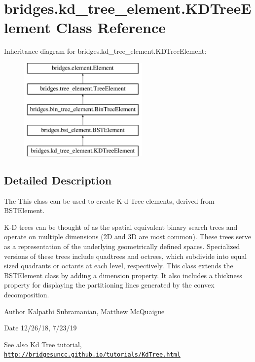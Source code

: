 \hypertarget{classbridges_1_1kd__tree__element_1_1_k_d_tree_element}{}\section{bridges.\+kd\+\_\+tree\+\_\+element.\+K\+D\+Tree\+Element Class Reference}
\label{classbridges_1_1kd__tree__element_1_1_k_d_tree_element}
Inheritance diagram for bridges.\+kd\+\_\+tree\+\_\+element.\+K\+D\+Tree\+Element\+:\begin{figure}[H]
\begin{center}
\leavevmode
\includegraphics[height=5.000000cm]{classbridges_1_1kd__tree__element_1_1_k_d_tree_element}
\end{center}
\end{figure}


\subsection{Detailed Description}
The This class can be used to create K-\/d Tree elements, derived from B\+S\+T\+Element. 

K-\/D trees can be thought of as the spatial equivalent binary search trees and operate on multiple dimensions (2D and 3D are most common). These trees serve as a representation of the underlying geometrically defined spaces. Specialized versions of these trees include quadtrees and octrees, which subdivide into equal sized quadrants or octants at each level, respectively. This class extends the B\+S\+T\+Element class by adding a dimension property. It also includes a thickness property for displaying the partitioning lines generated by the convex decomposition.

\begin{DoxyAuthor}{Author}
Kalpathi Subramanian, Matthew Mc\+Quaigue 
\end{DoxyAuthor}
\begin{DoxyDate}{Date}
12/26/18, 7/23/19
\end{DoxyDate}
\begin{DoxySeeAlso}{See also}
Kd Tree tutorial, \href{http://bridgesuncc.github.io/tutorials/KdTree.html}{\tt http\+://bridgesuncc.\+github.\+io/tutorials/\+Kd\+Tree.\+html} 
\end{DoxySeeAlso}
